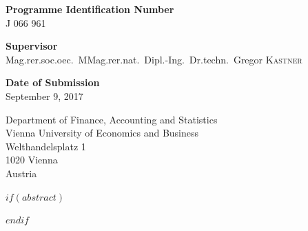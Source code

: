 \vspace{0.5cm}
\textbf{Programme Identification Number}\\
J 066 961

\vspace{0.5cm}
\textbf{Supervisor}\\
Mag.rer.soc.oec.\ MMag.rer.nat.\ Dipl.-Ing.\ Dr.techn.\ Gregor \textsc{Kastner}

\vspace{0.5cm}
\textbf{Date of Submission}\\
September 9, 2017

\vfill
Department of Finance, Accounting and Statistics\\
Vienna University of Economics and Business\\
Welthandelsplatz 1\\
1020 Vienna\\
Austria


\restoregeometry


$if(abstract)$
\begin{abstract}
$abstract$
\end{abstract}
$endif$